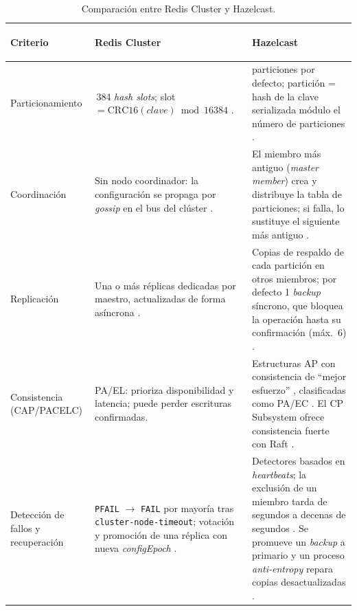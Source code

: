 \documentclass[11pt,a4paper]{article}
\begin{document}
\begin{table}[H]
  \centering
  \caption{Comparación entre Redis Cluster y Hazelcast.}
  \label{tab:comparacion}
  \footnotesize
  \renewcommand{\arraystretch}{1.25}
  \begin{tabularx}{\linewidth}{>{\bfseries\raggedright\arraybackslash}p{2.6cm} >{\raggedright\arraybackslash}X >{\raggedright\arraybackslash}X}
    \toprule
    \textbf{Criterio} & \textbf{Redis Cluster} & \textbf{Hazelcast} \\
    \midrule
    Particionamiento &
      16\,384 \emph{hash slots}; slot $=\mathrm{CRC16}(\mathit{clave}) \bmod 16384$
      \cite{redis2026clusterspec}. &
      271 particiones por defecto; partición = hash de la clave serializada
      módulo el número de particiones \cite{hazelcast2026partitioning}. \\
    Coordinación &
      Sin nodo coordinador: la configuración se propaga por \emph{gossip} en
      el bus del clúster \cite{redis2026clusterspec}. &
      El miembro más antiguo (\emph{master member}) crea y distribuye la tabla
      de particiones; si falla, lo sustituye el siguiente más antiguo
      \cite{hazelcast2026partitioning}. \\
    Replicación &
      Una o más réplicas dedicadas por maestro, actualizadas de forma
      asíncrona \cite{redis2026replication}. &
      Copias de respaldo de cada partición en otros miembros; por defecto 1
      \emph{backup} síncrono, que bloquea la operación hasta su confirmación
      (máx.\ 6) \cite{hazelcast2026backups}. \\
    Consistencia (CAP/PACELC) &
      PA/EL: prioriza disponibilidad y latencia; puede perder escrituras
      confirmadas. &
      Estructuras AP con consistencia de ``mejor esfuerzo''
      \cite{hazelcast2026replicationalgorithm}, clasificadas como PA/EC
      \cite{abadi2017hazelcast}. El CP Subsystem ofrece consistencia fuerte
      con Raft \cite{hazelcast2026cpsubsystem}. \\
    Detección de fallos y recuperación &
      \texttt{PFAIL} $\rightarrow$ \texttt{FAIL} por mayoría tras
      \texttt{cluster-node-timeout}; votación y promoción de una réplica con
      nueva \emph{configEpoch} \cite{redis2026clusterspec}. &
      Detectores basados en \emph{heartbeats}; la exclusión de un miembro
      tarda de segundos a decenas de segundos \cite{hazelcast2026splitbrain}.
      Se promueve un \emph{backup} a primario y un proceso
      \emph{anti-entropy} repara copias desactualizadas
      \cite{hazelcast2026replicationalgorithm}. \\

\end{tabularx}
\end{table}
\end{document}
